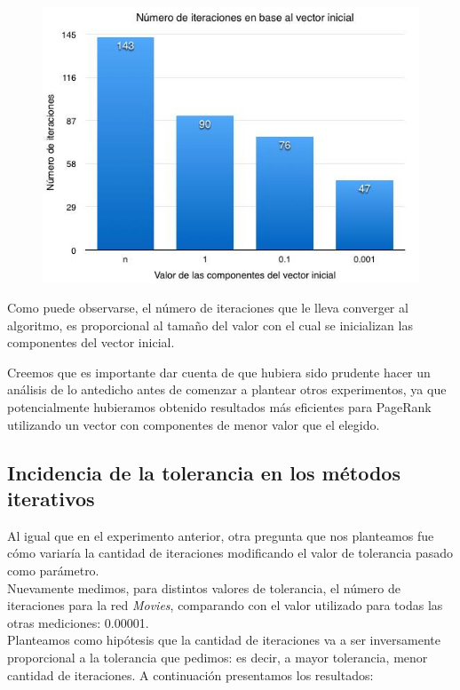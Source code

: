\documentclass[a4paper]{article}
\begin{document}
\begin{figure}[h!]
  \begin{center}
	\includegraphics[scale=0.50]{imagenes/002.jpg}
	\label{nombreparareferenciar}
  \end{center}
\end{figure}


Como puede observarse, el número de iteraciones que le lleva converger al algoritmo, es proporcional al tamaño del valor con el cual se inicializan las componentes del vector inicial.

Creemos que es importante dar cuenta de que hubiera sido prudente hacer un análisis de lo antedicho antes de comenzar a plantear otros experimentos, ya que potencialmente hubieramos obtenido resultados más eficientes para PageRank utilizando un vector con componentes de menor valor que el elegido.
\newpage
\subsection{Incidencia de la tolerancia en los métodos iterativos}

Al igual que en el experimento anterior, otra pregunta que nos planteamos fue cómo variaría la cantidad de iteraciones modificando el valor de tolerancia pasado como parámetro.\\
\indent Nuevamente medimos, para distintos valores de tolerancia, el número de iteraciones para la red \textit{Movies}, comparando con el valor utilizado para todas las otras mediciones: 0.00001.\\

Planteamos como hipótesis que la cantidad de iteraciones va a ser inversamente proporcional a la tolerancia que pedimos: es decir, a mayor tolerancia, menor cantidad de iteraciones. A continuación presentamos los resultados:
\end{document}
